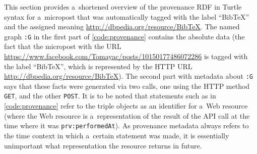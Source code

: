This section provides a~shortened overview of the provenance RDF
in Turtle syntax for a~micropost that was automatically
tagged with the label ``BibTeX''
and the assigned meaning
\url{http://dbpedia.org/resource/BibTeX}.
The named graph \texttt{:G} in the first part
of \autoref{code:provenance}
contains the absolute data (the fact that the micropost with
the URL
\url{https://www.facebook.com/Tomayac/posts/10150177486072286}
is tagged with the label ``BibTeX'', which is represented by
the HTTP URL \url{http://dbpedia.org/resource/BibTeX}).
The second part with metadata about \texttt{:G} says that
these facts were generated via two calls,
one using the HTTP method \texttt{GET},
and the other \texttt{POST}.
It is to be noted that statements
such as in \autoref{code:provenance} 
refer to the triple objects as an identifier for a~Web resource
(where the Web resource is a~representation of the result of the
API call at the time where it was \texttt{prv:performedAt}).
As provenance metadata always refers to the time context
in which a~certain statement was made,
it is essentially unimportant
what representation the resource returns in future.

